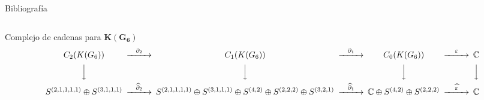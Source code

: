 \documentclass[final,xcolor=svgnames]{beamer}
\begin{document}
\begin{frame}{}
\begin{columns}
\begin{column}{0.5\textwidth}
\begin{block}{Bibliografía}
  
  
\end{block}
\end{column}
\end{columns}

  \vfill

  \begin{block}{Complejo de cadenas para $\boldsymbol{K(G_{6})}$}
    \[
    \begin{CD}
      C_{2}(K(G_{6})) @>{\partial_{2}}>> C_{1}(K(G_{6})) @>{\partial_{1}}>> C_{0}(K(G_{6})) @>{\varepsilon}>> \mathbb{C}\\
      @VVV   @VVV   @VVV   @VVV    \\
      S^{(2,1,1,1,1)}\oplus S^{(3,1,1,1)} @>{\widehat\partial_{2}}>>
      S^{(2,1,1,1,1)}\oplus S^{(3,1,1,1)}\oplus S^{(4,2)}\oplus S^{(2,2,2)}\oplus S^{(3,2,1)} @>{\widehat\partial_{1}}>> 
      \mathbb{C} \oplus S^{(4,2)}\oplus S^{(2,2,2)} @>{\widehat \varepsilon}>>  \mathbb{C}
    \end{CD}
    \]
  \end{block}
\end{frame}
\end{document}
